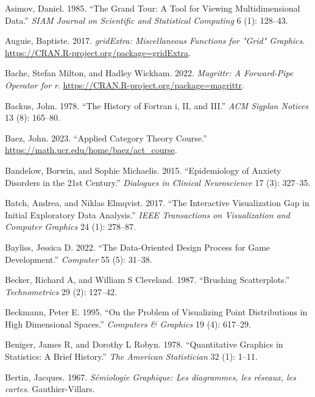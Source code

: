 \documentclass[
]{book}
\newlength{\cslhangindent}
\newenvironment{CSLReferences}[2] %
 {\begin{list}{}{%
  \setlength{\itemindent}{0pt}
  \setlength{\leftmargin}{0pt}
  \setlength{\parsep}{0pt}
  \ifodd #1
   \setlength{\leftmargin}{\cslhangindent}
   \setlength{\itemindent}{-1\cslhangindent}
  \fi
  \setlength{\itemsep}{#2\baselineskip}}}
 {\end{list}}
\theoremstyle{definition}
\theoremstyle{definition}
\theoremstyle{definition}
\theoremstyle{definition}
\theoremstyle{remark}
\begin{document}
\begin{CSLReferences}{1}{0}
Asimov, Daniel. 1985. {``The Grand Tour: A Tool for Viewing Multidimensional Data.''} \emph{SIAM Journal on Scientific and Statistical Computing} 6 (1): 128--43.

Auguie, Baptiste. 2017. \emph{gridExtra: Miscellaneous Functions for "Grid" Graphics}. \url{https://CRAN.R-project.org/package=gridExtra}.

Bache, Stefan Milton, and Hadley Wickham. 2022. \emph{Magrittr: A Forward-Pipe Operator for r}. \url{https://CRAN.R-project.org/package=magrittr}.

Backus, John. 1978. {``The History of Fortran i, II, and III.''} \emph{ACM Sigplan Notices} 13 (8): 165--80.

Baez, John. 2023. {``{Applied Category Theory Course}.''} \url{https://math.ucr.edu/home/baez/act_course}.

Bandelow, Borwin, and Sophie Michaelis. 2015. {``Epidemiology of Anxiety Disorders in the 21st Century.''} \emph{Dialogues in Clinical Neuroscience} 17 (3): 327--35.

Batch, Andrea, and Niklas Elmqvist. 2017. {``The Interactive Visualization Gap in Initial Exploratory Data Analysis.''} \emph{IEEE Transactions on Visualization and Computer Graphics} 24 (1): 278--87.

Bayliss, Jessica D. 2022. {``The Data-Oriented Design Process for Game Development.''} \emph{Computer} 55 (5): 31--38.

Becker, Richard A, and William S Cleveland. 1987. {``Brushing Scatterplots.''} \emph{Technometrics} 29 (2): 127--42.

Beckmann, Peter E. 1995. {``On the Problem of Visualizing Point Distributions in High Dimensional Spaces.''} \emph{Computers \& Graphics} 19 (4): 617--29.

Beniger, James R, and Dorothy L Robyn. 1978. {``Quantitative Graphics in Statistics: A Brief History.''} \emph{The American Statistician} 32 (1): 1--11.

Bertin, Jacques. 1967. \emph{{Sémiologie Graphique: Les diagrammes, les réseaux, les cartes}}. Gauthier-Villars.


\end{CSLReferences}
\end{document}

